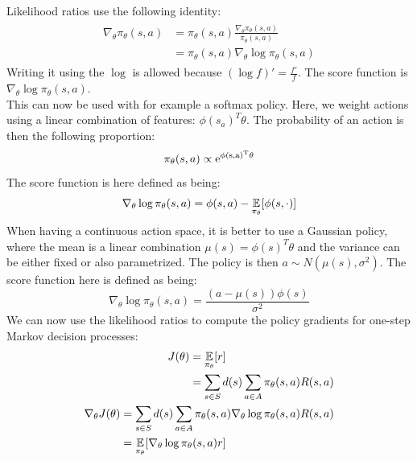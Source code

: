 Likelihood ratios use the following identity:
\begin{align}
\begin{split}
\nabla_{\theta}\pi_{\theta}(s,a) &= \pi_{\theta}(s,a) \frac{\nabla_{\theta}\pi_{\theta}(s,a)}{\pi_{\theta}(s,a)}\\
&= \pi_{\theta}(s,a) \nabla_{\theta} \log \pi_{\theta}(s,a)
\end{split}
\end{align}
Writing it using the $\log$ is allowed because $(\log f)' = \frac{f'}{f}$. The score function is $\nabla_{\theta} \log \pi_{\theta}(s,a)$.\\
This can now be used with for example a softmax policy. Here, we weight actions using a linear combination of features: $\phi(s_a)^T \theta$. The probability of an action is then the following proportion:
\begin{equation}
\pi_{\theta}(s,a) \propto \rm{e}^{\phi(s,a)^T \theta}
\end{equation}
The score function is here defined as being:
\begin{equation}
\nabla_{\theta} \log \pi_{\theta}(s,a) = \phi(s,a) - \operatorname*{\mathop{{}\mathbb{E}}}_{\pi_{\theta}}[\phi(s,\cdot)]
\end{equation}
When having a continuous action space, it is better to use a Gaussian policy, where the mean is a linear combination $\mu(s) = \phi(s)^T \theta$ and the variance can be either fixed or also parametrized. The policy is then $a \sim N(\mu(s), \sigma^2)$. The score function here is defined as being:
\begin{equation}
\nabla_{\theta} \log \pi_{\theta}(s,a) = \frac{(a-\mu(s))\phi(s)}{\sigma^2}
\end{equation}
We can now use the likelihood ratios to compute the policy gradients for one-step Markov decision processes:
\begin{subequations}
\begin{align}
\begin{split}
J(\theta) &= \operatorname*{\mathop{{}\mathbb{E}}}_{\pi_{\theta}}[r]\\
&= \sum_{s \in S} d(s) \sum_{a \in A} \pi_{\theta}(s,a) R(s,a)
\end{split}\\
\begin{split}
\nabla_{\theta} J(\theta) &= \sum_{s \in S} d(s) \sum_{a \in A} \pi_{\theta}(s,a) \nabla_{\theta} \log \pi_{\theta}(s,a) R(s,a)\\
&= \operatorname*{\mathop{{}\mathbb{E}}}_{\pi_{\theta}} [\nabla_{\theta} \log \pi_{\theta}(s,a)r]
\end{split}
\end{align}
\end{subequations}
